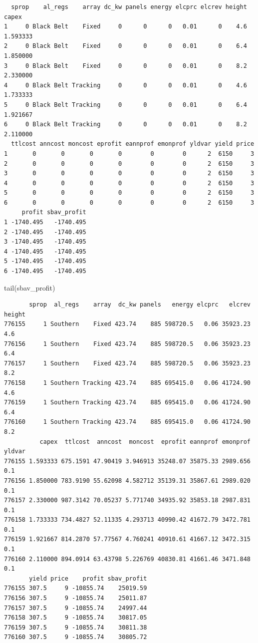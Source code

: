 \documentclass[
  letterpaper,
  DIV=11,
  numbers=noendperiod]{scrartcl}
\newenvironment{Shaded}{\begin{snugshade}}{\end{snugshade}}
\newcommand{\FunctionTok}[1]{\textcolor[rgb]{0.28,0.35,0.67}{#1}}
\newcommand{\NormalTok}[1]{\textcolor[rgb]{0.00,0.23,0.31}{#1}}
\begin{document}
\begin{verbatim}
  sprop    al_regs    array dc_kw panels energy elcprc elcrev height    capex
1     0 Black Belt    Fixed     0      0      0   0.01      0    4.6 1.593333
2     0 Black Belt    Fixed     0      0      0   0.01      0    6.4 1.850000
3     0 Black Belt    Fixed     0      0      0   0.01      0    8.2 2.330000
4     0 Black Belt Tracking     0      0      0   0.01      0    4.6 1.733333
5     0 Black Belt Tracking     0      0      0   0.01      0    6.4 1.921667
6     0 Black Belt Tracking     0      0      0   0.01      0    8.2 2.110000
  ttlcost anncost moncost eprofit eannprof emonprof yldvar yield price
1       0       0       0       0        0        0      2  6150     3
2       0       0       0       0        0        0      2  6150     3
3       0       0       0       0        0        0      2  6150     3
4       0       0       0       0        0        0      2  6150     3
5       0       0       0       0        0        0      2  6150     3
6       0       0       0       0        0        0      2  6150     3
     profit sbav_profit
1 -1740.495   -1740.495
2 -1740.495   -1740.495
3 -1740.495   -1740.495
4 -1740.495   -1740.495
5 -1740.495   -1740.495
6 -1740.495   -1740.495
\end{verbatim}

\begin{Shaded}
\begin{Highlighting}[]
\FunctionTok{tail}\NormalTok{(sbav\_profit)}
\end{Highlighting}
\end{Shaded}

\begin{verbatim}
       sprop  al_regs    array  dc_kw panels   energy elcprc   elcrev height
776155     1 Southern    Fixed 423.74    885 598720.5   0.06 35923.23    4.6
776156     1 Southern    Fixed 423.74    885 598720.5   0.06 35923.23    6.4
776157     1 Southern    Fixed 423.74    885 598720.5   0.06 35923.23    8.2
776158     1 Southern Tracking 423.74    885 695415.0   0.06 41724.90    4.6
776159     1 Southern Tracking 423.74    885 695415.0   0.06 41724.90    6.4
776160     1 Southern Tracking 423.74    885 695415.0   0.06 41724.90    8.2
          capex  ttlcost  anncost  moncost  eprofit eannprof emonprof yldvar
776155 1.593333 675.1591 47.90419 3.946913 35248.07 35875.33 2989.656    0.1
776156 1.850000 783.9190 55.62098 4.582712 35139.31 35867.61 2989.020    0.1
776157 2.330000 987.3142 70.05237 5.771740 34935.92 35853.18 2987.831    0.1
776158 1.733333 734.4827 52.11335 4.293713 40990.42 41672.79 3472.781    0.1
776159 1.921667 814.2870 57.77567 4.760241 40910.61 41667.12 3472.315    0.1
776160 2.110000 894.0914 63.43798 5.226769 40830.81 41661.46 3471.848    0.1
       yield price    profit sbav_profit
776155 307.5     9 -10855.74    25019.59
776156 307.5     9 -10855.74    25011.87
776157 307.5     9 -10855.74    24997.44
776158 307.5     9 -10855.74    30817.05
776159 307.5     9 -10855.74    30811.38
776160 307.5     9 -10855.74    30805.72
\end{verbatim}
\end{document}
